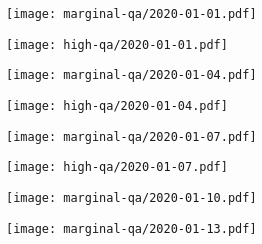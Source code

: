 \documentclass{article}
\begin{document}
\begin{figure}[H]
	\ContinuedFloat
	\centering
	\begin{subfigure}{0.48\linewidth}
		\texttt{[image: marginal-qa/2020-01-01.pdf]}
	\end{subfigure}
	\begin{subfigure}{0.48\linewidth}
		\texttt{[image: high-qa/2020-01-01.pdf]}
	\end{subfigure}
	\begin{subfigure}{0.48\linewidth}
		\texttt{[image: marginal-qa/2020-01-04.pdf]}
	\end{subfigure}
	\begin{subfigure}{0.48\linewidth}
		\texttt{[image: high-qa/2020-01-04.pdf]}
	\end{subfigure}
	\begin{subfigure}{0.48\linewidth}
		\texttt{[image: marginal-qa/2020-01-07.pdf]}
	\end{subfigure}
	\begin{subfigure}{0.48\linewidth}
		\texttt{[image: high-qa/2020-01-07.pdf]}
	\end{subfigure}
	\begin{subfigure}{\linewidth}
		\texttt{[image: marginal-qa/2020-01-10.pdf]}
	\end{subfigure}
	\begin{subfigure}{\linewidth}
		\texttt{[image: marginal-qa/2020-01-13.pdf]}
	\end{subfigure}
\end{figure}
\end{document}
